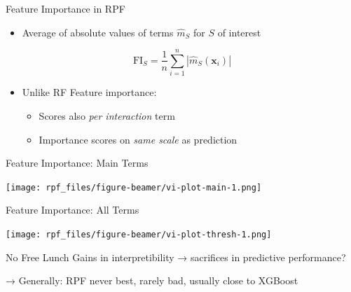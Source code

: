 \documentclass[aspectratio=169,12pt]{beamer}
\providecommand{\tightlist}{%
  \setlength{\itemsep}{2pt}\setlength{\parskip}{0pt}}
\begin{document}
\begin{frame}{Feature Importance in RPF}
\label{feature-importance-in-rpf}
\begin{itemize}[<+->]
\tightlist
\item
  Average of absolute values of terms \(\hat{m}_S\) for \(S\) of
  interest
\end{itemize}

\[\mathrm{FI}_S = \frac{1}{n} \sum_{i=1}^n |\hat{m}_S(\mathbf{x}_i)|\]

\begin{itemize}[<+->]
\tightlist
\item
  Unlike RF Feature importance:

  \begin{itemize}[<+->]
  \tightlist
  \item
    Scores also \emph{per interaction} term
  \item
    Importance scores on \emph{same scale} as prediction
  \end{itemize}
\end{itemize}
\end{frame}

\begin{frame}{Feature Importance: Main Terms}
\label{feature-importance-main-terms}
\begin{center}
\texttt{[image: rpf\_files/figure-beamer/vi-plot-main-1.png]}
\end{center}
\end{frame}

\begin{frame}{Feature Importance: All Terms}
\label{feature-importance-all-terms}
\begin{center}
\texttt{[image: rpf\_files/figure-beamer/vi-plot-thresh-1.png]}
\end{center}
\end{frame}

\begin{frame}{No Free Lunch}
\label{no-free-lunch}
Gains in interpretibility → sacrifices in predictive performance?

\vfill

\pause


\pause

\vfill

→ Generally: RPF never best, rarely bad, usually close to XGBoost
\end{frame}
\end{document}

